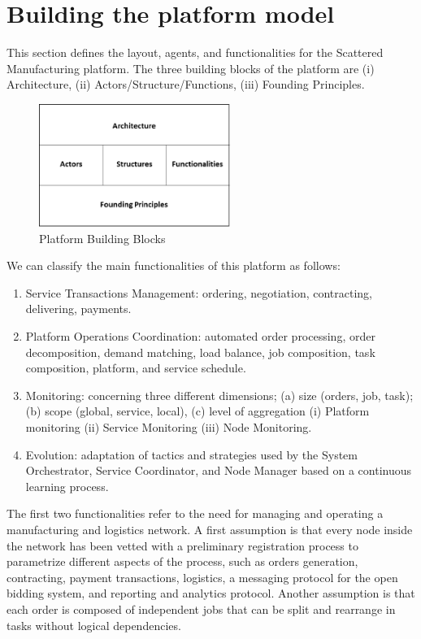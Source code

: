 \section{Building the platform model}
This section defines the layout, agents, and functionalities for the Scattered Manufacturing platform. The three building blocks of the platform are (i) Architecture, (ii) Actors/Structure/Functions, (iii) Founding Principles.
\begin{figure}[h]
    \centering
    \includegraphics[height=4cm, keepaspectratio]{images/platform-building-blocks}
    \caption{Platform Building Blocks}
    \label{fig:platform-building-blocks}
\end{figure}
We can classify the main functionalities of this platform as follows:
\begin{enumerate}
    \item Service Transactions Management: ordering, negotiation, contracting, delivering, payments.
    \item Platform Operations Coordination: automated order processing, order decomposition, demand matching, load balance, job composition, task composition, platform, and service schedule.
    \item Monitoring: concerning three different dimensions; (a) size (orders, job, task); (b) scope (global, service, local), (c) level of aggregation (i) Platform monitoring (ii) Service Monitoring (iii) Node Monitoring.
    \item Evolution: adaptation of tactics and strategies used by the System Orchestrator, Service Coordinator, and Node Manager based on a continuous learning process.
\end{enumerate}
The first two functionalities refer to the need for managing and operating a manufacturing and logistics network. A first assumption is that every node inside the network has been vetted with a preliminary registration process to parametrize different aspects of the process, such as orders generation, contracting, payment transactions, logistics, a messaging protocol for the open bidding system, and reporting and analytics protocol. Another assumption is that each order is composed of independent jobs that can be split and rearrange in tasks without logical dependencies.
